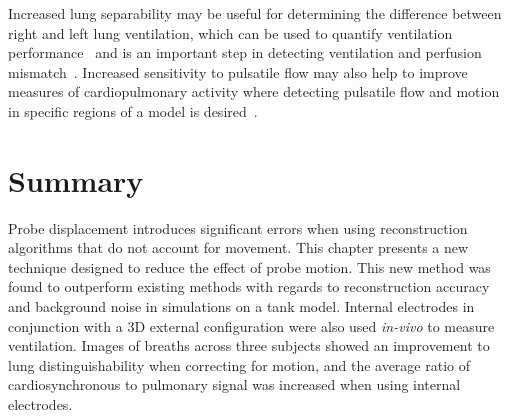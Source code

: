 Increased lung separability may be useful for determining the difference between right 
and left lung ventilation, which can be used to quantify ventilation 
performance~\parencite{sage_assessing_2018}
and is an important step in detecting ventilation and perfusion
mismatch~\parencite{stowe_comparison_2019,kircher_regional_2021,leonhardt_electrical_2012}.
Increased sensitivity to pulsatile flow may also help to improve measures
of cardiopulmonary activity where detecting pulsatile flow 
and motion in specific regions of a model is 
desired~\parencite{braun_accuracy_2018,proenca_non-invasive_2020}.

\section{Summary}
Probe displacement introduces significant errors when using 
reconstruction algorithms that do not account for movement. This chapter presents
a new technique designed to reduce the effect of probe motion.
This new method 
was found to outperform existing methods with regards to reconstruction 
accuracy and background noise in simulations on a tank model. 
Internal electrodes in conjunction with a 3D external configuration were also 
used \emph{in-vivo} to measure ventilation. 
Images of breaths across three subjects showed an improvement to lung distinguishability
when correcting for motion, and the average ratio of cardiosynchronous
to pulmonary signal was increased when using internal electrodes. 